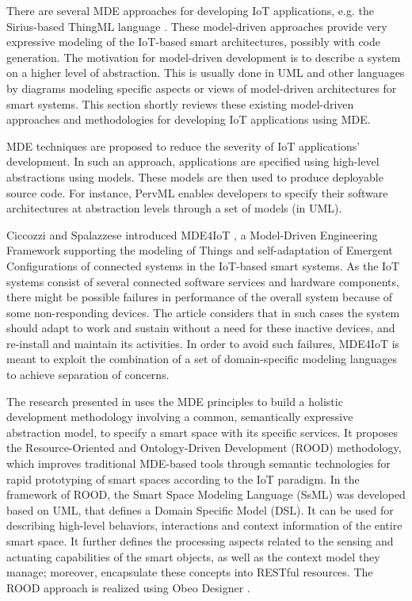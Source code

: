 There are several MDE approaches for developing IoT applications, e.g. the Sirius-based ThingML language \cite{Fleurey+2011+1}. These model-driven approaches provide very expressive modeling of the IoT-based smart architectures, possibly with code generation. The motivation for model-driven development is to describe a system on a higher level of abstraction. This is usually done in UML and other languages by diagrams modeling specific aspects or views of model-driven architectures for smart systems. This section shortly reviews these existing model-driven approaches and methodologies for developing IoT applications using MDE.

MDE techniques are proposed to reduce the severity of IoT applications' development. In such an approach, applications are specified using high-level abstractions using models. These models are then used to produce deployable source code. For instance, PervML \cite{serral2010towards} enables developers to specify their software architectures at abstraction levels through a set of models (in UML).

Ciccozzi and Spalazzese introduced MDE4IoT \cite{ciccozzi2016mde4iot}, a Model-Driven Engineering Framework supporting the modeling of Things and self-adaptation of Emergent Configurations of connected systems in the IoT-based smart systems. As the IoT systems consist of several connected software services and hardware components, there might be possible failures in performance of the overall system because of some non-responding devices. The article considers that in such cases the system should adapt to work and sustain without a need for these inactive devices, and re-install and maintain its activities. In order to avoid such failures, MDE4IoT is meant to exploit the combination of a set of domain-specific modeling languages to achieve separation of concerns.

The research presented in \cite{Corredor+2012} uses the MDE principles to build a holistic development methodology involving a common, semantically expressive abstraction model, to specify a smart space with its specific services. It proposes the Resource-Oriented and Ontology-Driven Development (ROOD) methodology, which improves traditional MDE-based tools through semantic technologies for rapid prototyping of smart spaces according to the IoT paradigm. In the framework of ROOD, the Smart Space Modeling Language (SsML) was developed based on UML, that defines a Domain Specific Model (DSL). It can be used for describing high-level behaviors, interactions and context information of the entire smart space. It further defines the processing aspects related to the sensing and actuating capabilities of the smart objects, as well as the context model they manage; moreover, encapsulate these concepts into RESTful resources. The ROOD approach is realized using Obeo Designer \cite{Designer2016}.

